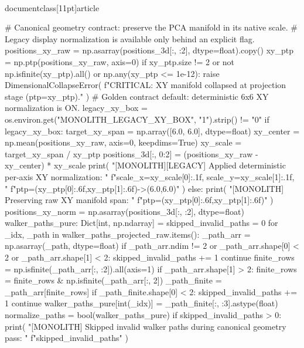 \\documentclass[11pt]{article}
\begin{document}
\begin{CodeBlock}
{{{{{    # Canonical geometry contract: preserve the PCA manifold in its native scale.
    # Legacy display normalization is available only behind an explicit flag.
    positions_xy_raw = np.asarray(positions_3d[:, :2], dtype=float).copy()
    xy_ptp = np.ptp(positions_xy_raw, axis=0)
    if xy_ptp.size != 2 or not np.isfinite(xy_ptp).all() or np.any(xy_ptp <= 1e-12):
        raise DimensionalCollapseError(
            f"CRITICAL: XY manifold collapsed at projection stage (ptp={xy_ptp})."
        )
    # Golden contract default: deterministic 6x6 XY normalization is ON.
    legacy_xy_box = os.environ.get("MONOLITH_LEGACY_XY_BOX", "1").strip() != "0"
    if legacy_xy_box:
        target_xy_span = np.array([6.0, 6.0], dtype=float)
        xy_center = np.mean(positions_xy_raw, axis=0, keepdims=True)
        xy_scale = target_xy_span / xy_ptp
        positions_3d[:, 0:2] = (positions_xy_raw - xy_center) * xy_scale
        print(
            "[MONOLITH][LEGACY] Applied deterministic per-axis XY normalization: "
            f"scale_x={xy_scale[0]:.1f}, scale_y={xy_scale[1]:.1f}, "
            f"ptp=({xy_ptp[0]:.6f},{xy_ptp[1]:.6f})->(6.0,6.0)"
        )
    else:
        print(
            "[MONOLITH] Preserving raw XY manifold span: "
            f"ptp=({xy_ptp[0]:.6f},{xy_ptp[1]:.6f})"
        )
    positions_xy_norm = np.asarray(positions_3d[:, :2], dtype=float)
    walker_paths_pure: Dict[int, np.ndarray] = {}
    skipped_invalid_paths = 0
    for _idx, _path in walker_paths_projected_raw.items():
        _path_arr = np.asarray(_path, dtype=float)
        if _path_arr.ndim != 2 or _path_arr.shape[0] < 2 or _path_arr.shape[1] < 2:
            skipped_invalid_paths += 1
            continue
        finite_rows = np.isfinite(_path_arr[:, :2]).all(axis=1)
        if _path_arr.shape[1] > 2:
            finite_rows = finite_rows & np.isfinite(_path_arr[:, 2])
        _path_finite = _path_arr[finite_rows]
        if _path_finite.shape[0] < 2:
            skipped_invalid_paths += 1
            continue
        walker_paths_pure[int(_idx)] = _path_finite[:, :3].astype(float)
    normalize_paths = bool(walker_paths_pure)
    if skipped_invalid_paths > 0:
        print(
            "[MONOLITH] Skipped invalid walker paths during canonical geometry pass: "
            f"{skipped_invalid_paths}"
        )

}}}}}
\end{CodeBlock}
\end{document}
